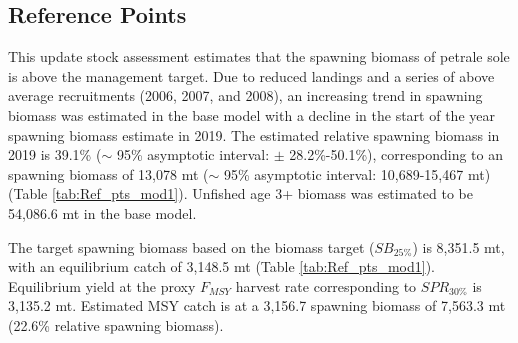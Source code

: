 \documentclass[12pt,]{article}
\begin{document}
\subsection*{Reference Points}\label{reference-points}

This update stock assessment estimates that the spawning biomass of
petrale sole is above the management target. Due to reduced landings and
a series of above average recruitments (2006, 2007, and 2008), an
increasing trend in spawning biomass was estimated in the base model
with a decline in the start of the year spawning biomass estimate in
2019. The estimated relative spawning biomass in 2019 is 39.1\%
(\(\sim\) 95\% asymptotic interval: \(\pm\) 28.2\%-50.1\%),
corresponding to an spawning biomass of 13,078 mt (\(\sim\) 95\%
asymptotic interval: 10,689-15,467 mt) (Table \ref{tab:Ref_pts_mod1}).
Unfished age 3+ biomass was estimated to be 54,086.6 mt in the base
model.

The target spawning biomass based on the biomass target (\(SB_{25\%}\))
is 8,351.5 mt, with an equilibrium catch of 3,148.5 mt (Table
\ref{tab:Ref_pts_mod1}). Equilibrium yield at the proxy \(F_{MSY}\)
harvest rate corresponding to \(SPR_{30\%}\) is 3,135.2 mt. Estimated
MSY catch is at a 3,156.7 spawning biomass of 7,563.3 mt (22.6\%
relative spawning biomass).
\end{document}
